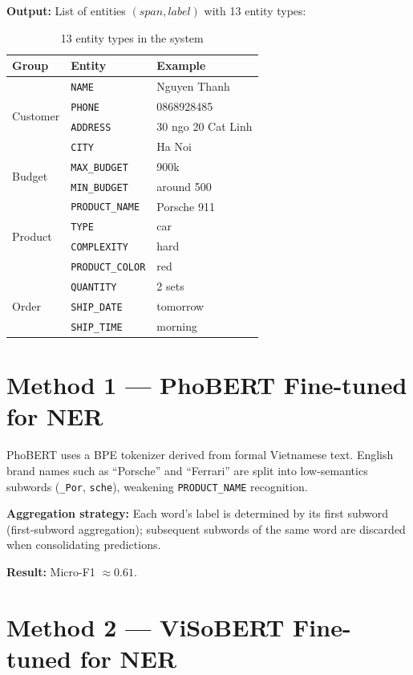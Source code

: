 \documentclass[12pt, a4paper]{report}
\begin{document}
\textbf{Output:} List of entities $(span, label)$ with 13 entity types:

\begin{table}[H]
\centering
\caption{13 entity types in the system}
\label{tab:entities}
\begin{tabular}{lll}
\toprule
\textbf{Group} & \textbf{Entity} & \textbf{Example} \\
\midrule
\multirow{4}{*}{Customer}
  & \texttt{NAME}    & Nguyen Thanh \\
  & \texttt{PHONE}   & 0868928485 \\
  & \texttt{ADDRESS} & 30 ngo 20 Cat Linh \\
  & \texttt{CITY}    & Ha Noi \\
\midrule
\multirow{2}{*}{Budget}
  & \texttt{MAX\_BUDGET} & 900k \\
  & \texttt{MIN\_BUDGET} & around 500 \\
\midrule
\multirow{4}{*}{Product}
  & \texttt{PRODUCT\_NAME}  & Porsche 911 \\
  & \texttt{TYPE}           & car \\
  & \texttt{COMPLEXITY}     & hard \\
  & \texttt{PRODUCT\_COLOR} & red \\
\midrule
\multirow{3}{*}{Order}
  & \texttt{QUANTITY}   & 2 sets \\
  & \texttt{SHIP\_DATE} & tomorrow \\
  & \texttt{SHIP\_TIME} & morning \\
\bottomrule
\end{tabular}
\end{table}

\section{Method 1 --- PhoBERT Fine-tuned for NER}

PhoBERT uses a BPE tokenizer derived from formal Vietnamese text.
English brand names such as ``Porsche'' and ``Ferrari''
are split into low-semantics subwords (\texttt{\_Por}, \texttt{sche}),
weakening \texttt{PRODUCT\_NAME} recognition.

\textbf{Aggregation strategy:} Each word's label is determined by its first subword
(first-subword aggregation); subsequent subwords of the same word are discarded
when consolidating predictions.

\textbf{Result:} Micro-F1 $\approx 0.61$.

\section{Method 2 --- ViSoBERT Fine-tuned for NER}
\end{document}

